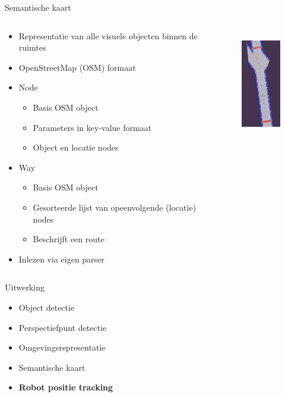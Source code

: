 \documentclass[11pt,t]{beamer}
\begin{document}
\begin{frame}[fragile]{Semantische kaart}
	\begin{columns}[t]
		\begin{column}{.7\textwidth}
			\begin{itemize}
				\item Representatie van alle visuele objecten binnen de ruimtes
				\item OpenStreetMap (OSM) formaat
				\item Node
				\begin{itemize}
					\item Basis OSM object
					\item Parameters in key-value formaat
					\item Object en locatie nodes
				\end{itemize}

				\item Way
				\begin{itemize}
					\item Basis OSM object
					\item Gesorteerde lijst van opeenvolgende (locatie) nodes
					\item Beschrijft een route
				\end{itemize}

				\item Inlezen via eigen parser
			\end{itemize}
		\end{column}
		\begin{column}{.3\textwidth}
			\begin{figure}
				\centering
				\includegraphics[height=180px]{graphics/kaart.png}
			\end{figure}
		\end{column}
	\end{columns}	
\end{frame}

%
%
\begin{frame}[fragile]{Uitwerking}
	\begin{itemize}
		\item Object detectie
		\item Perspectiefpunt detectie
		\item Omgevingsrepresentatie
		\item Semantische kaart
		\item \textbf{Robot positie tracking}
	\end{itemize}
\end{frame}
\end{document}
